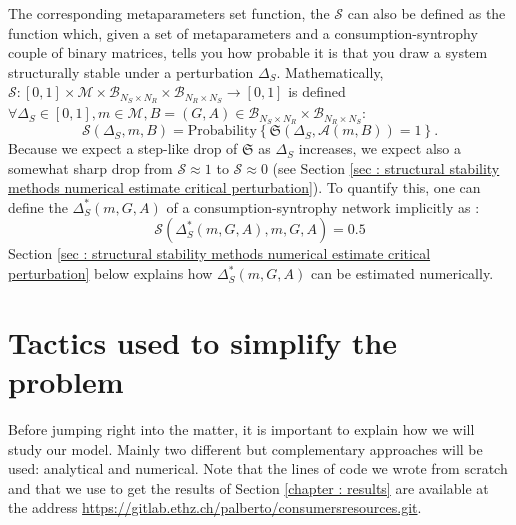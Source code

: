 \documentclass[12pt, titlepage]{report}
\begin{document}
The corresponding metaparameters set function, the  $\mathcal{S}$
can also be defined as the function which, given a set of metaparameters and a consumption-syntrophy couple of binary matrices, tells you how probable it is that you draw a system structurally stable under a perturbation $\Delta_S$. Mathematically, $\mathcal{S} : [0,1] \times \mathcal{M} \times \mathcal{B}_{N_S \times N_R} \times \mathcal{B}_{N_R \times N_S} \rightarrow [0,1]$ is defined $\forall \Delta_S \in [0,1], m \in \mathcal{M}, B=(G,A) \in \mathcal{B}_{N_S \times N_R} \times \mathcal{B}_{N_R \times N_S}$:
\begin{equation}
{
\mathcal{S}(\Delta_S, m, B)= \text{Probability}\left\{\mathfrak{S}(\Delta_S, \mathcal{A}(m, B))=1\right\}.
}
\end{equation}
Because we expect a step-like drop of $\mathfrak{S}$ as $\Delta_S$ increases, we expect also a somewhat sharp drop from $\mathcal{S} \approx 1$ to $\mathcal{S} \approx 0$ (see Section \ref{sec : structural stability methods numerical estimate critical perturbation}). To quantify this, one can define the  $\Delta_S^*(m,G,A)$ of a consumption-syntrophy network implicitly as :
\begin{equation}
\mathcal{S}(\Delta_S^*(m, G, A), m, G,A)=0.5
\end{equation}
Section \ref{sec : structural stability methods numerical estimate critical perturbation} below explains how $\Delta_S^*(m, G,A)$ can be estimated numerically.


\newpage
\section{Tactics used to simplify the problem}\label{sec: tactics used to simplify the problem}
Before jumping right into the matter, it is important to explain how we will study our model. Mainly two different but complementary approaches will be used: analytical and numerical. Note that the %
lines of code we wrote from scratch and that we use to get the results of Section \ref{chapter : results} are available at the address \url{https://gitlab.ethz.ch/palberto/consumersresources.git}.
\end{document}
